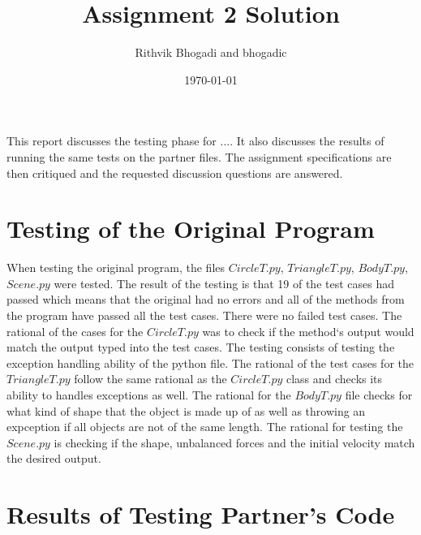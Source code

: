 \documentclass[12pt]{article}
\title{Assignment 2 Solution}
\author{Rithvik Bhogadi and bhogadic}
\date{\today}
\begin{document}
\maketitle

This report discusses the testing phase for .... It also discusses the results
of running the same tests on the partner files. The assignment specifications
are then critiqued and the requested discussion questions are answered.

\section{Testing of the Original Program}

When testing the original program, the files $CircleT.py$, $TriangleT.py$, $BodyT.py$, $Scene.py$ were tested. The result of the testing is that 19 of the
test cases had passed which means that the original had no errors and all of the methods from the program have passed all the test cases. There were no
failed test cases. The rational of the cases for the $CircleT.py$ was to check if the method`s output would match the output typed into the test cases.
The testing consists of testing the exception handling ability of the python file. The rational of the test cases for the $TriangleT.py$ follow the 
same rational as the $CircleT.py$ class and checks its ability to handles exceptions as well. The rational for the $BodyT.py$ file checks for what kind of
shape that the object is made up of as well as throwing an expception if all objects are not of the same length. The rational for testing the $Scene.py$ is
checking if the shape, unbalanced forces and the initial velocity match the desired output.

\section{Results of Testing Partner's Code}
\end{document}
